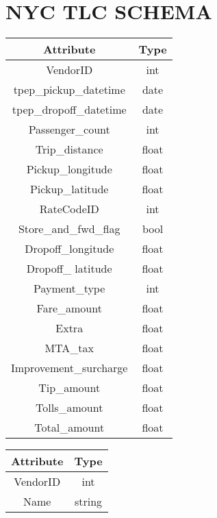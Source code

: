 \chapter{NYC TLC SCHEMA}
\label{chp:nyc_data}

\begin{center}
  \begin{tabular}{ | c | c | }
    \hline
    \textbf{Attribute} & \textbf{Type} \\ \hline
		VendorID & int \\ \hline
		tpep\_pickup\_datetime  & date \\ \hline
		tpep\_dropoff\_datetime & date \\ \hline
		Passenger\_count & int \\ \hline
		Trip\_distance & float \\ \hline
		Pickup\_longitude & float \\ \hline
		Pickup\_latitude & float \\ \hline
		RateCodeID & int \\ \hline
		Store\_and\_fwd\_flag & bool \\ \hline
		Dropoff\_longitude & float \\ \hline
		Dropoff\_ latitude & float \\ \hline
		Payment\_type & int \\ \hline
		Fare\_amount & float \\ \hline
		Extra & float \\ \hline
		MTA\_tax & float \\ \hline
		Improvement\_surcharge & float \\ \hline
		Tip\_amount & float \\ \hline
		Tolls\_amount & float \\ \hline
		Total\_amount & float \\ \hline
  \end{tabular}
\end{center}
\label{tbl:append_nyc}

\begin{center}
  \begin{tabular}{ | c | c | }
    \hline
    \textbf{Attribute} & \textbf{Type} \\ \hline
		VendorID & int \\ \hline
		Name & string \\ \hline
  \end{tabular}
\end{center}
\label{tbl:append_nyc_vendors}


